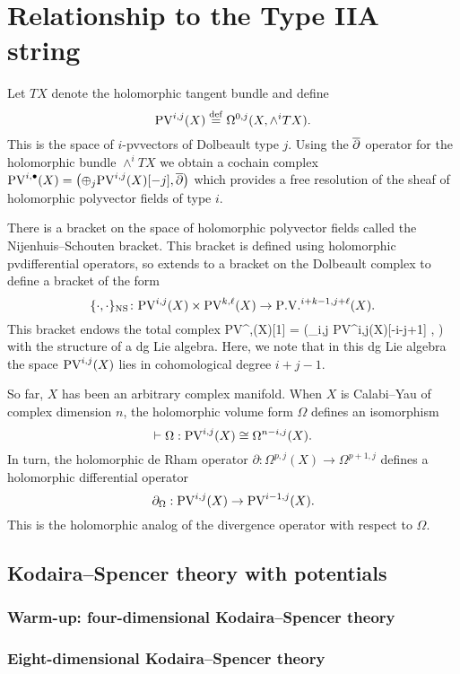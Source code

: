 \documentclass[11pt]{amsart}
\def\pv{{\rm PV}}
\begin{document}
\section{Relationship to the Type IIA string}
\label{sec:org355a726}

Let $TX$ denote the holomorphic tangent bundle and define
\[
\pv^{i,j}(X) \define \Omega^{0,j}(X, \wedge^{i} TX) .\]
This is the space of $i$-pvvectors of Dolbeault type $j$.
Using the $\overline{\partial}$ operator for the holomorphic bundle $\wedge^{i}TX$ we obtain a cochain complex $\pv^{i,\bu}(X) = \left(\oplus_{j} \pv^{i,j}(X) [-j], \dbar \right)$ which provides a free resolution of the sheaf of holomorphic polyvector fields of type $i$.


There is a bracket on the space of holomorphic polyvector fields called the Nijenhuis--Schouten bracket.
This bracket is defined using holomorphic pvdifferential operators, so extends to a bracket on the Dolbeault complex to define a bracket of the form
\[
  \{\cdot, \cdot\}_{\rm NS} \colon \pv^{i,j}(X) \times \pv^{k,\ell}(X) \to \PV^{i+k-1, j+\ell}(X) .
\]
This bracket endows the total complex
\beqn\label{eqn:pvlie1}
\pv^{\bu,\bu}(X)[1] = \left(\oplus_{i,j} \pv^{i,j}(X)[-i-j+1] , \dbar \right)
\eeqn
with the structure of a dg Lie algebra.
Here, we note that in this dg Lie algebra the space $\pv^{i,j}(X)$ lies in cohomological degree $i+j-1$.


So far, $X$ has been an arbitrary complex manifold.
When $X$ is Calabi--Yau of complex dimension $n$, the holomorphic volume form $\Omega$ defines an isomorphism
\[
  \vdash \Omega : \pv^{i,j}(X) \cong \Omega^{n-i, j}(X).
\]
In turn, the holomorphic de Rham operator $\partial : \Omega^{p, j}(X) \to \Omega^{p+1,j}$ defines a holomorphic differential operator
\[
  \partial_{\Omega} : \pv^{i,j}(X) \to \pv^{i-1,j}(X) .
\]
This is the holomorphic analog of the divergence operator with respect to $\Omega$.

\subsection{Kodaira--Spencer theory with potentials}
\label{sec:org5e18f8e}
\subsubsection{Warm-up: four-dimensional Kodaira--Spencer theory}
\label{sec:org91dc4ca}
\subsubsection{Eight-dimensional Kodaira--Spencer theory}
\label{sec:orgeb2dd4d}
\end{document}
